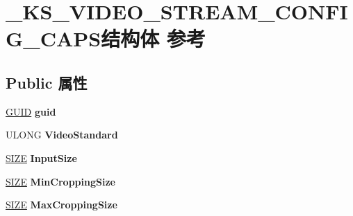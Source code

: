 \hypertarget{struct___k_s___v_i_d_e_o___s_t_r_e_a_m___c_o_n_f_i_g___c_a_p_s}{}\section{\+\_\+\+K\+S\+\_\+\+V\+I\+D\+E\+O\+\_\+\+S\+T\+R\+E\+A\+M\+\_\+\+C\+O\+N\+F\+I\+G\+\_\+\+C\+A\+P\+S结构体 参考}
\label{struct___k_s___v_i_d_e_o___s_t_r_e_a_m___c_o_n_f_i_g___c_a_p_s}
\subsection*{Public 属性}
\begin{DoxyCompactItemize}
\item 
\mbox{\label{struct___k_s___v_i_d_e_o___s_t_r_e_a_m___c_o_n_f_i_g___c_a_p_s_ae026e9daf5e364783cac151aae155f7a}} 
\hyperlink{interface_g_u_i_d}{G\+U\+ID} {\bfseries guid}
\item 
\mbox{\label{struct___k_s___v_i_d_e_o___s_t_r_e_a_m___c_o_n_f_i_g___c_a_p_s_ac63a21d42fc19b87bf5bcb0fd7de72fe}} 
U\+L\+O\+NG {\bfseries Video\+Standard}
\item 
\mbox{\label{struct___k_s___v_i_d_e_o___s_t_r_e_a_m___c_o_n_f_i_g___c_a_p_s_ab76335b8e7bdfd5ca9cec04f28526d31}} 
\hyperlink{structtag_s_i_z_e}{S\+I\+ZE} {\bfseries Input\+Size}
\item 
\mbox{\label{struct___k_s___v_i_d_e_o___s_t_r_e_a_m___c_o_n_f_i_g___c_a_p_s_aa0e9de7da88b7b30097224b4d6b729d3}} 
\hyperlink{structtag_s_i_z_e}{S\+I\+ZE} {\bfseries Min\+Cropping\+Size}
\item 
\mbox{\label{struct___k_s___v_i_d_e_o___s_t_r_e_a_m___c_o_n_f_i_g___c_a_p_s_aa8888a67c50a369094d88396f25ba716}} 
\hyperlink{structtag_s_i_z_e}{S\+I\+ZE} {\bfseries Max\+Cropping\+Size}
\item 
\mbox{\label{struct___k_s___v_i_d_e_o___s_t_r_e_a_m___c_o_n_f_i_g___c_a_p_s_ae291445c296ab13f9717a5f0ad494c24}} 

\end{DoxyCompactItemize}

